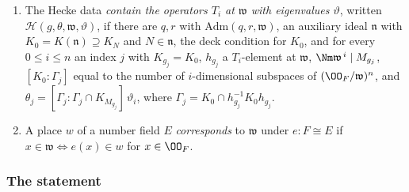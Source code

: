 \begin{definition}
\begin{enumerate}
  $N_1$, such that, with $K_0'=K(N_0\kappa\mathfrak a')$: $K_{M_{g_j}}\subseteq K_0'$, $M_{g_j}\in
  N_0\kappa\mathfrak a'$, every $u\in K_0$ is $xu'$ with $x\in K_{g_j}\cap K_0$ and $u'\in K_0'$,
  $\kappa\kstwoLaHat\subseteq h_2\kstwoLaHat$, $N_1\in N_0\mathfrak a'$, $h_2xK_{M_{g_j}}(h_2x)^{-1}\subseteq
  K_{N_1}$ for $x\in K_{g_j}$, $h_1K_{N_1}h_1^{-1}\subseteq K_N$, and either $h_1=1$ or $h_1$ is a
  $T_i$-element at a maximal ideal $\mathfrak w'\supseteq\mathfrak u$ with $\mathfrak a'\subseteq\mathfrak
  a\mathfrak w'$, $i\le n$ and $\Nm\mathfrak w'^{\,i}\mid N_1$.
\item The Hecke data \emph{contain the operators $T_i$ at $\mathfrak w$ with eigenvalues $\vartheta$},
  written $\mathcal{H}(g,\theta,\mathfrak w,\vartheta)$, if
  there are $q,r$ with $\mathrm{Adm}(q,r,\mathfrak w)$, an auxiliary ideal $\mathfrak n$ with
  $K_0=K(\mathfrak n)\supseteq K_N$ and
  $N\in\mathfrak n$, the deck condition for $K_0$, and for every $0\le i\le n$ an index $j$ with
  $K_{g_j}=K_0$, $h_{g_j}$ a $T_i$-element at $\mathfrak w$, $\Nm\mathfrak w^{\,i}\mid M_{g_j}$,
  $[K_0:\Gamma_j]$ equal to the number of $i$-dimensional subspaces of
  $(\kstwoOF/\mathfrak w)^n$, and $\theta_j=[\Gamma_j:\Gamma_j\cap K_{M_{g_j}}]\,\vartheta_i$, where
  $\Gamma_j=K_0\cap h_{g_j}^{-1}K_0h_{g_j}$.
\item A place $w$ of a number field $E$ \emph{corresponds} to $\mathfrak w$ under $e\colon F\cong
  E$ if $x\in\mathfrak w\iff e(x)\in w$ for
  $x\in\kstwoOF$.
\end{enumerate}
\end{definition}

\subsubsection{The statement}

